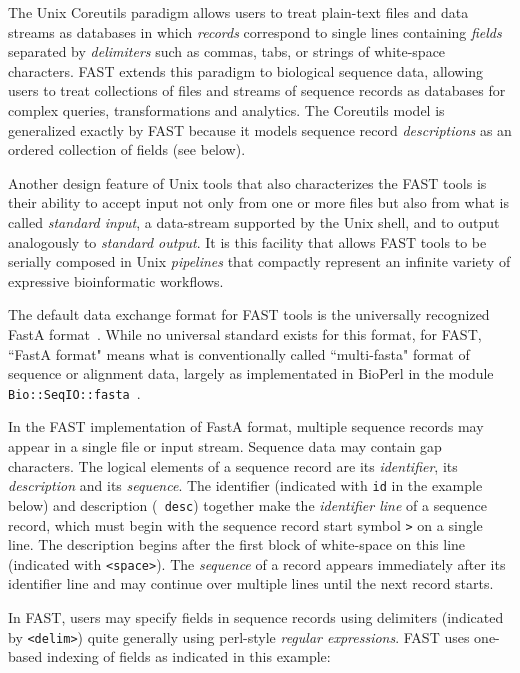 \documentclass{frontiersSCNS} %
\begin{document}
The Unix Coreutils paradigm allows users to treat plain-text files and
data streams as databases in which {\it records} correspond to single
lines containing {\it fields} separated by {\it delimiters} such as
commas, tabs, or strings of white-space characters.  FAST extends this
paradigm to biological sequence data, allowing users to treat
collections of files and streams of sequence records as databases for
complex queries, transformations and analytics. The Coreutils model is
generalized exactly by FAST because it models sequence record {\it
  descriptions} as an ordered collection of fields (see below).

Another design feature of Unix tools that also characterizes the FAST
tools is their ability to accept input not only from one or more files
but also from what is called {\it standard input}, a data-stream
supported by the Unix shell, and to output analogously to {\it
  standard output}. It is this facility that allows FAST tools to be
serially composed in Unix {\it pipelines} that compactly represent an
infinite variety of expressive bioinformatic workflows. 

The default data exchange format for FAST tools is the universally
recognized FastA format~\citep{lipman1985rapid}. While no universal
standard exists for this format, for FAST, ``FastA format" means what
is conventionally called ``multi-fasta" format of sequence or alignment
data, largely as implementated in BioPerl in the module {\tt
  Bio::SeqIO::fasta}~\citep{Stajich2002}.

In the FAST implementation of FastA format, multiple sequence records
may appear in a single file or input stream. Sequence data may contain
gap characters. The logical elements of a sequence record are its {\it
  identifier}, its {\it description} and its {\it sequence}. The identifier
(indicated with {\tt id} in the example below) and description ({\tt
  desc}) together make the {\it identifier line} of a sequence record,
which must begin with the sequence record start symbol {\tt >} on a
single line. The description begins after the first block of
white-space on this line (indicated with {\tt <space>}). The {\it
  sequence} of a record appears immediately after its identifier line
and may continue over multiple lines until the next record starts.

In FAST, users may specify fields in sequence records using delimiters
(indicated by {\tt <delim>}) quite generally using perl-style
{\it regular expressions}. FAST uses one-based indexing of fields as
indicated in this example:
\end{document}
